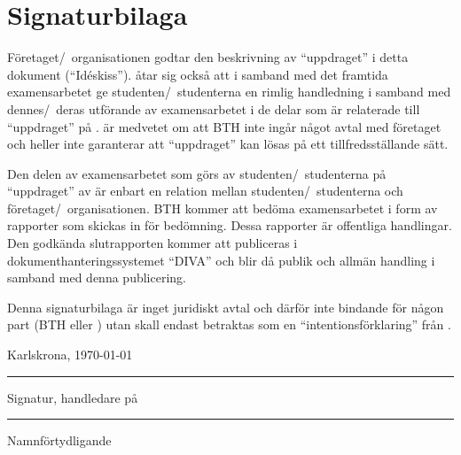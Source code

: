 \section{Signaturbilaga}
Företaget/~organisationen \textit{\theCompany} godtar den beskrivning av ``uppdraget'' i
detta dokument (``Idéskiss'').
\textit{\theCompany} åtar sig också att i samband med det framtida examensarbetet ge
studenten/~studenterna en rimlig handledning i samband med dennes/~deras utförande av
examensarbetet i de delar som är relaterade till ``uppdraget'' på \textit{\theCompany}.
\textit{\theCompany} är medvetet om att BTH inte ingår något avtal med företaget och
heller inte garanterar att ``uppdraget'' kan lösas på ett tillfredsställande sätt.

Den delen av examensarbetet som görs av studenten/~studenterna på ``uppdraget'' av
\textit{\theCompany} är enbart en relation mellan studenten/~studenterna och företaget/~organisationen.
BTH kommer att bedöma examensarbetet i form av rapporter som skickas in för bedömning.
Dessa rapporter är offentliga handlingar.
Den godkända slutrapporten kommer att publiceras i
dokumenthanteringssystemet ``DIVA'' och blir då publik och allmän handling i samband
med denna publicering.

Denna signaturbilaga är inget juridiskt avtal och därför inte bindande för någon part
(BTH eller \textit{\theCompany}) utan skall endast betraktas som en ``intentionsförklaring''
från \textit{\theCompany}.

\vspace{12mm}
Karlskrona, \today
\vspace{12mm}

\rule{10cm}{1pt}

Signatur, handledare på \theCompany
\vspace{12mm}

\rule{10cm}{1pt}

Namnförtydligande
